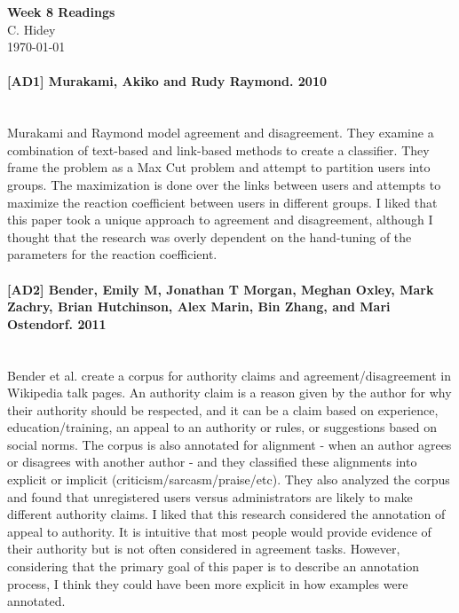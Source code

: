 \documentclass[12pt]{article}
\begin{document}
\begin{center}
  \textbf{Week 8 Readings} \\
  C. Hidey \\
  \today
\end{center}

\paragraph{{\bf [AD1] Murakami, Akiko and Rudy Raymond. 2010}}
\text{} \\
Murakami and Raymond model agreement and disagreement.  They examine a combination of text-based and link-based methods to create a classifier.  They frame the problem as a Max Cut problem and attempt to partition users into groups.  The maximization is done over the links between users and attempts to maximize the reaction coefficient between users in different groups.  I liked that this paper took a unique approach to agreement and disagreement, although I thought that the research was overly dependent on the hand-tuning of the parameters for the reaction coefficient.

\paragraph{{\bf [AD2] Bender, Emily M, Jonathan T Morgan, Meghan Oxley, Mark Zachry, Brian Hutchinson, Alex Marin, Bin Zhang, and Mari Ostendorf. 2011}}
\text{} \\
Bender et al. create a corpus for authority claims and agreement/disagreement in Wikipedia talk pages.  An authority claim is a reason given by the author for why their authority should be respected, and it can be a claim based on experience, education/training, an appeal to an authority or rules, or suggestions based on social norms.  The corpus is also annotated for alignment - when an author agrees or disagrees with another author - and they classified these alignments into explicit or implicit (criticism/sarcasm/praise/etc).  They also analyzed the corpus and found that unregistered users versus administrators are likely to make different authority claims.  I liked that this research considered the annotation of appeal to authority.  It is intuitive that most people would provide evidence of their authority but is not often considered in agreement tasks.  However, considering that the primary goal of this paper is to describe an annotation process, I think they could have been more explicit in how examples were annotated.
\end{document}
